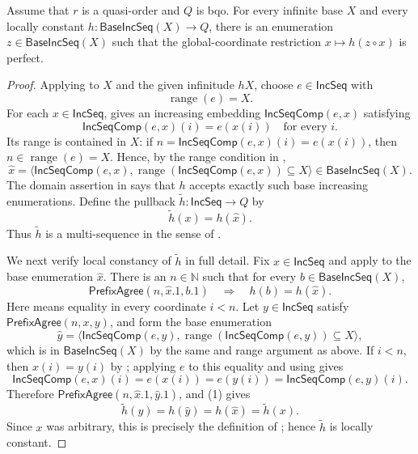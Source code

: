 \begin{lemma}
Assume that $r$ is a quasi-order and $Q$ is bqo.  For every infinite base
$X$ and every locally constant $h:\mathsf{BaseIncSeq}(X)\to Q$, there is
an enumeration $z\in\mathsf{BaseIncSeq}(X)$ such that the global-coordinate
restriction $x\mapsto h(z\circ x)$ is perfect.
\end{lemma}
\begin{proof}
Applying  to $X$ and the given infinitude
$hX$, choose $e\in\mathsf{IncSeq}$ with
\[
\operatorname{range}(e)=X.
\]
For each $x\in\mathsf{IncSeq}$,  gives an increasing
embedding $\mathsf{IncSeqComp}(e,x)$ satisfying
\[
\mathsf{IncSeqComp}(e,x)(i)=e(x(i))
\quad\text{for every }i.
\]
Its range is contained in $X$: if
$n=\mathsf{IncSeqComp}(e,x)(i)=e(x(i))$, then
$n\in\operatorname{range}(e)=X$.  Hence, by the range condition in
,
\[
\widehat x=\bigl\langle\mathsf{IncSeqComp}(e,x),
  \operatorname{range}(\mathsf{IncSeqComp}(e,x))\subseteq X\bigr\rangle
\in\mathsf{BaseIncSeq}(X).
\]
The domain assertion in  says that $h$ accepts
exactly such base increasing enumerations.  Define the pullback
$\widetilde h:\mathsf{IncSeq}\to Q$ by
\[
\widetilde h(x)=h(\widehat x).
\]
Thus $\widetilde h$ is a multi-sequence in the sense of
.

We next verify local constancy of $\widetilde h$ in full detail.  Fix
$x\in\mathsf{IncSeq}$ and apply  to the base
enumeration $\widehat x$.  There is an $n\in\mathbb N$ such that for every
$b\in\mathsf{BaseIncSeq}(X)$,
\[
\mathsf{PrefixAgree}(n,\widehat x.1,b.1)
\quad\Longrightarrow\quad h(b)=h(\widehat x).
\tag{1}
\]
Here  means equality in every coordinate $i<n$.
Let $y\in\mathsf{IncSeq}$ satisfy
$\mathsf{PrefixAgree}(n,x,y)$, and form the base enumeration
\[
\widehat y=\bigl\langle\mathsf{IncSeqComp}(e,y),
  \operatorname{range}(\mathsf{IncSeqComp}(e,y))\subseteq X\bigr\rangle,
\]
which is in $\mathsf{BaseIncSeq}(X)$ by the same
 and range argument as above.  If $i<n$, then
$x(i)=y(i)$ by ; applying $e$ to this equality and
using  gives
\[
\mathsf{IncSeqComp}(e,x)(i)=e(x(i))=e(y(i))
  =\mathsf{IncSeqComp}(e,y)(i).
\]
Therefore
$\mathsf{PrefixAgree}(n,\widehat x.1,\widehat y.1)$, and (1) gives
\[
\widetilde h(y)=h(\widehat y)=h(\widehat x)=\widetilde h(x).
\]
Since $x$ was arbitrary, this is precisely the definition of
; hence $\widetilde h$ is locally constant.


\end{proof}
